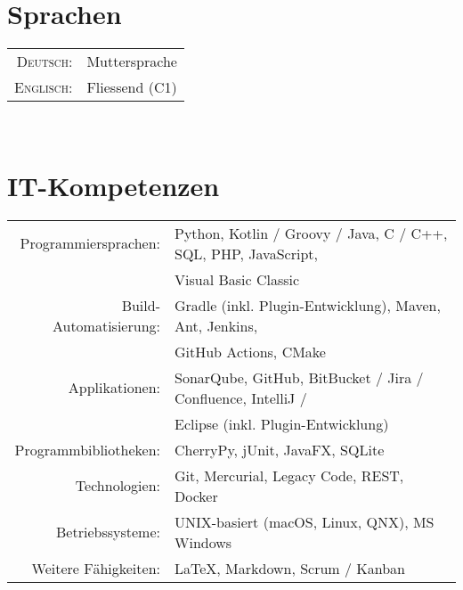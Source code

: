 \documentclass[10pt,a4paper]{article}
\begin{document}
%
%
%
\nocite{*}
\printbibliography[title={Publikationen}]


\section{Sprachen}

\begin{tabular}{rl}
	\textsc{Deutsch:}		& Muttersprache \\
	\textsc{Englisch:}		& Fliessend (C1) \\
\end{tabular} \\


\section{IT-Kompetenzen}

\begin{tabular}{rl}
	Programmiersprachen:	& Python, Kotlin / Groovy / Java, C / C++, SQL, PHP, JavaScript, \\
						& Visual Basic Classic \\
	Build-Automatisierung:	& Gradle (inkl. Plugin-Entwicklung), Maven, Ant, Jenkins, \\
						& GitHub Actions, CMake \\
	Applikationen:			& SonarQube, GitHub, BitBucket / Jira / Confluence, IntelliJ / \\
						& Eclipse (inkl. Plugin-Entwicklung) \\
	Programmbibliotheken:	& CherryPy, jUnit, JavaFX, SQLite \\
	Technologien:			& Git, Mercurial, Legacy Code, REST,  Docker \\
	Betriebssysteme:		& UNIX-basiert (macOS, Linux, QNX), MS Windows \\
	Weitere F\"ahigkeiten:	& {\fb \LaTeX}\setmainfont[SmallCapsFont=Fontin-SmallCaps.otf]{Fontin.otf}, Markdown, Scrum / Kanban \\
\end{tabular} \\
\end{document}
